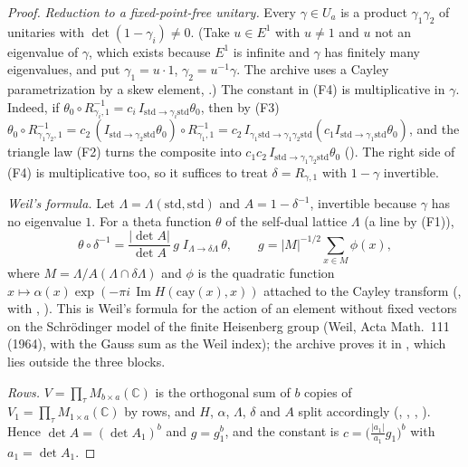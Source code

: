 \documentclass[11pt]{article}
\theoremstyle{definition}
\theoremstyle{remark}
\begin{document}
\begin{proof}
\emph{Reduction to a fixed-point-free unitary.} Every $\gamma\in U_a$ is a product $\gamma_1\gamma_2$ of unitaries with $\det(1-\gamma_i)\neq0$. (Take $u\in E^1$ with $u\neq1$ and $u$ not an eigenvalue of $\gamma$, which exists because $E^1$ is infinite and $\gamma$ has finitely many eigenvalues, and put $\gamma_1=u\cdot1$, $\gamma_2=u^{-1}\gamma$. The archive uses a Cayley parametrization by a skew element, .) The constant in (F4) is multiplicative in $\gamma$. Indeed, if $\theta_0\circ R_{\gamma_i,1}^{-1}=c_i\,I_{\mathrm{std}\to\gamma_i\mathrm{std}}\theta_0$, then by (F3) $\theta_0\circ R_{\gamma_1\gamma_2,1}^{-1}=c_2\,(I_{\mathrm{std}\to\gamma_2\mathrm{std}}\theta_0)\circ R_{\gamma_1,1}^{-1}=c_2\,I_{\gamma_1\mathrm{std}\to\gamma_1\gamma_2\mathrm{std}}(c_1I_{\mathrm{std}\to\gamma_1\mathrm{std}}\theta_0)$, and the triangle law (F2) turns the composite into $c_1c_2\,I_{\mathrm{std}\to\gamma_1\gamma_2\mathrm{std}}\theta_0$ (). The right side of (F4) is multiplicative too, so it suffices to treat $\delta=R_{\gamma,1}$ with $1-\gamma$ invertible.

\emph{Weil's formula.} Let $\Lambda=\Lambda(\mathrm{std},\mathrm{std})$ and $A=1-\delta^{-1}$, invertible because $\gamma$ has no eigenvalue $1$. For a theta function $\theta$ of the self-dual lattice $\Lambda$ (a line by (F1)),
\[
\theta\circ\delta^{-1}=\frac{\lvert\det A\rvert}{\det A}\,g\;I_{\Lambda\to\delta\Lambda}\,\theta,\qquad g=\lvert M\rvert^{-1/2}\sum_{x\in M}\phi(x),
\]
where $M=\Lambda/A(\Lambda\cap\delta\Lambda)$ and $\phi$ is the quadratic function $x\mapsto\alpha(x)\exp(-\pi i\,\operatorname{Im}H(\mathrm{cay}(x),x))$ attached to the Cayley transform (, with , ). This is Weil's formula for the action of an element without fixed vectors on the Schr\"odinger model of the finite Heisenberg group (Weil, Acta Math.\ 111 (1964), with the Gauss sum as the Weil index); the archive proves it in , which lies outside the three blocks.

\emph{Rows.} $V=\prod_\tau M_{b\times a}(\mathbb C)$ is the orthogonal sum of $b$ copies of $V_1=\prod_\tau M_{1\times a}(\mathbb C)$ by rows, and $H$, $\alpha$, $\Lambda$, $\delta$ and $A$ split accordingly (, , , ). Hence $\det A=(\det A_1)^b$ and $g=g_1^b$, and the constant is $c=\bigl(\tfrac{\lvert a_1\rvert}{a_1}g_1\bigr)^b$ with $a_1=\det A_1$.


\end{proof}
\end{document}
